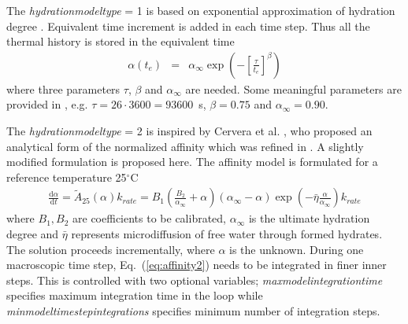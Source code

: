 \documentclass[a4paper]{article}
\newcommand{\param}[1]{{\it #1}}
\newcommand{\ud}{\mathrm{d}}
\newcommand{\refeq}[1]{Eq.~(\ref{#1})}
\newcommand{\C}{$^{\circ}\mathrm{C}$}
\begin{document}
The \param{hydrationmodeltype} = 1 is based on exponential approximation of hydration degree \cite{Schindler:2005}. Equivalent time increment is added in each time step. Thus all the thermal history is stored in the equivalent time
\begin{eqnarray}
\alpha(t_e) &=& \alpha_\infty \exp\left(-\left[\frac{\tau}{t_e} \right]^\beta \right)\label{eq:affinity1}
\end{eqnarray}
where three parameters $\tau$, $\beta$ and $\alpha_\infty$ are needed. Some meaningful parameters are provided in \cite{Schindler:2005}, e.g. $\tau=26\cdot3600=93600$~s, $\beta=0.75$ and $\alpha_\infty=0.90$.

The \param{hydrationmodeltype} = 2 is inspired by Cervera et al. \cite{Cervera:99}, who proposed an analytical form of the normalized affinity which was refined in \cite{Gawin:06a}. A slightly modified formulation is proposed here. The affinity model is formulated for a reference temperature 25\C
\begin{eqnarray}
\frac{\ud \alpha}{\ud t} = \tilde{A}_{25}(\alpha) k_{rate}= B_1 \left( \frac{B_2}{\alpha_\infty} + \alpha \right ) \left( \alpha_\infty - \alpha \right) \exp\left(-\bar{\eta}\frac{\alpha}{\alpha_\infty}\right) k_{rate} \label{eq:affinity2}
\end{eqnarray}
where $B_1, B_2$ are coefficients to be calibrated, $\alpha_\infty$ is the ultimate hydration degree and $\bar{\eta}$ represents microdiffusion of free water through formed hydrates. The solution proceeds incrementally, where $\alpha$ is the unknown. During one macroscopic time step, \refeq{eq:affinity2} needs to be integrated in finer inner steps. This is controlled with two optional variables; \param{maxmodelintegrationtime} specifies maximum integration time in the loop while \param{minmodeltimestepintegrations} specifies minimum number of integration steps.
\end{document}
